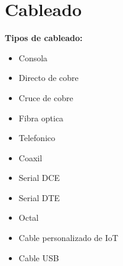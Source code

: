 \documentclass{article}
\begin{document}
\newpage
\section{Cableado}
\textbf{Tipos de cableado:}
\begin{itemize}
    \item Consola
    \item Directo de cobre
    \item Cruce de cobre
    \item Fibra optica
    \item Telefonico
    \item Coaxil
    \item Serial DCE
    \item Serial DTE
    \item Octal
    \item Cable personalizado de IoT
    \item Cable USB
\end{itemize}

\newpage
\end{document}

